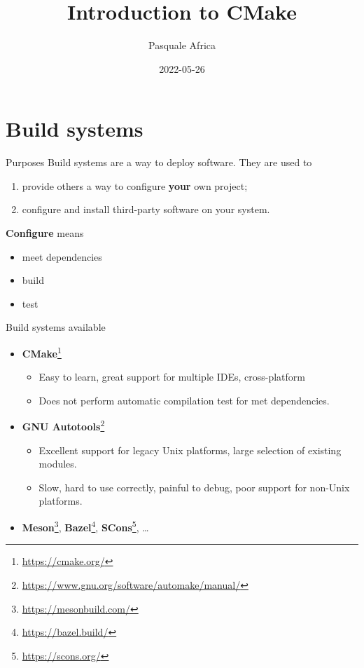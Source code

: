 \documentclass[aspectratio=169,11pt]{beamer}
\title{Introduction to CMake}
\author{Pasquale Africa}
\institute{Politecnico di Milano}
\date{2022-05-26}
\newcommand{\pro}{\textcolor{example}{\ding{51}}}
\newcommand{\con}{\alert{\ding{55}}}
\begin{document}
\begin{frame}[plain]{}
    \maketitle
\end{frame}

\section{Build systems}
\begin{frame}{Purposes}
    Build systems are a way to deploy software.
    \vfill
    They are used to
    \begin{enumerate}
        \item provide others a way to configure \textbf{your} own project;
        \item configure and install third-party software on your system.
    \end{enumerate}
    \vfill
    \textbf{Configure} means
    \begin{itemize}
        \item meet dependencies
        \item build
        \item test
    \end{itemize}
\end{frame}

\begin{frame}{Build systems available}
    \begin{itemize}
    \item \textbf{CMake}\footnote{\url{https://cmake.org/}}
    \begin{itemize}
    \item[\pro] Easy to learn, great support for multiple IDEs, cross-platform
    \item[\con] Does not perform automatic compilation test for met dependencies.
    \end{itemize}
    \item \textbf{GNU Autotools}\footnote{\url{https://www.gnu.org/software/automake/manual/}}
    \begin{itemize}
    \item[\pro] Excellent support for legacy Unix platforms, large selection of existing modules.
    \item[\con] Slow, hard to use correctly, painful to debug, poor support for non-Unix platforms.
    \end{itemize}
    \item \textbf{Meson}\footnote{\url{https://mesonbuild.com/}}, \textbf{Bazel}\footnote{\url{https://bazel.build/}}, \textbf{SCons}\footnote{\url{https://scons.org/}}, \dots
    \end{itemize}
\end{frame}
\end{document}
